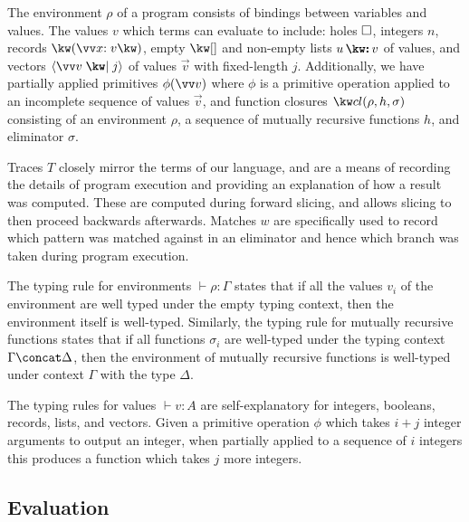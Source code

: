 

The environment $\rho$ of a program consists of bindings between variables and values. The values $v$ which terms can evaluate to include: holes $\square$, integers $n$, records $\exRec{\vec{\bind{x}{v}}}$, empty $\exNil$ and non-empty lists $\exCons{u}{v}$ of values, and vectors $\exVecVal{\vec{v}}{j}$ of values $\vec{v}$ with fixed-length $j$. Additionally, we have partially applied primitives $\exPrimOp{\phi}{\vec{v}}$ where $\phi$ is a primitive operation applied to an incomplete sequence of values $\vec{v}$, and function closures $\exClosure{\rho}{h}{\sigma}$ consisting of an environment $\rho$, a sequence of mutually recursive functions $h$, and eliminator $\sigma$. 



Traces $T$ closely mirror the terms of our language, and are a means of recording the details of program execution and providing an explanation of how a result was computed. These are computed during forward slicing, and allows slicing to then proceed backwards afterwards. Matches $w$ are specifically used to record which pattern was matched against in an eliminator and hence which branch was taken during program execution. 



The typing rule for environments $\vdash \rho: \Gamma$ states that if all the values $v_i$ of the environment are well typed under the empty typing context, then the environment itself is well-typed. Similarly, the typing rule for mutually recursive functions states that if all functions $\sigma_i$ are well-typed under the typing context $\Gamma \concat \Delta$, then the environment of mutually recursive functions is well-typed under context $\Gamma$ with the type $\Delta$.

The typing rules for values $\vdash v: A$ are self-explanatory for integers, booleans, records, lists, and vectors. Given a primitive operation $\phi$ which takes $i+j$ integer arguments to output an integer, when partially applied to a sequence of $i$ integers this produces a function which takes $j$ more integers.



\subsection{Evaluation}




